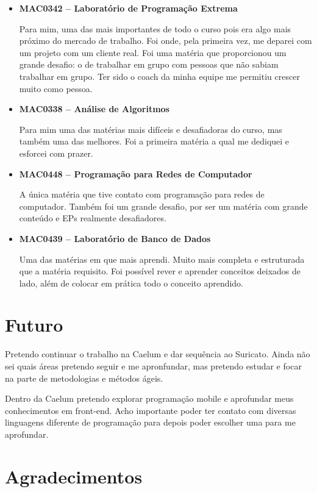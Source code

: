 \documentclass[titlepage,a4paper]{article}
\begin{document}
\begin{itemize}
	\item{\textbf{MAC0342 -- Laboratório de Programação Extrema}
	
    Para mim, uma das mais importantes de todo o curso pois era algo mais próximo do mercado de trabalho. Foi onde, pela primeira vez, me deparei com um projeto com um cliente real. Foi uma matéria que proporcionou um grande desafio: o de trabalhar em grupo com pessoas que não sabiam trabalhar em grupo. Ter sido o coach da minha equipe me permitiu crescer muito como pessoa.}
	\item{\textbf{MAC0338 -- Análise de Algoritmos}
	
	Para mim uma das matérias mais difíceis e desafiadoras do curso, mas também uma das melhores. Foi a primeira matéria a qual me dediquei e esforcei com prazer.}
	\item{\textbf{MAC0448 -- Programação para Redes de Computador}
	
	A única matéria que tive contato com programação para redes de computador. Também foi um grande desafio, por ser um matéria com grande conteúdo e EPs realmente desafiadores.}
	\item{\textbf{MAC0439 -- Laboratório de Banco de Dados}
	
    Uma das matérias em que mais aprendi. Muito mais completa e estruturada que a matéria requisito. Foi possível rever e aprender conceitos deixados de lado, além de colocar em prática todo o conceito aprendido.}
\end{itemize}

\section{Futuro}

Pretendo continuar o trabalho na Caelum e dar sequência ao Suricato. Ainda não sei quais áreas pretendo seguir e me apronfundar, mas pretendo estudar e focar na parte de metodologias e métodos ágeis.

Dentro da Caelum pretendo explorar programação mobile e aprofundar meus conhecimentos em front-end. Acho importante poder ter contato com diversas linguagens diferente de programação para depois poder escolher uma para me aprofundar.

\section{Agradecimentos}
\end{document}
